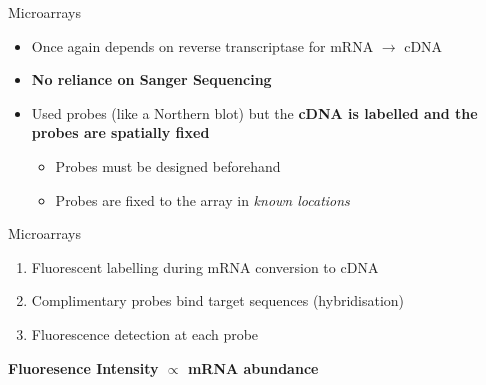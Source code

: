 \documentclass[aspectratio=169,11pt]{beamer}
\begin{document}
\begin{frame}{Microarrays}

	\begin{itemize}
		\item Once again depends on reverse transcriptase for mRNA $\rightarrow$ cDNA
		\item \textbf{No reliance on Sanger Sequencing}
		\item Used probes (like a Northern blot) but the \textbf{cDNA is labelled and the probes are spatially fixed}
		\begin{itemize}
			\item Probes must be designed beforehand
			\item Probes are fixed to the array in \textit{known locations}		
		\end{itemize}
	\end{itemize}
	
\end{frame}

\begin{frame}{Microarrays}

	\begin{enumerate}

		\item Fluorescent labelling during mRNA conversion to cDNA
		\item Complimentary probes bind target sequences (hybridisation)
		\item Fluorescence detection at each probe
	
	\end{enumerate}

	\begin{center}
	\textbf{Fluoresence Intensity $\propto$ mRNA abundance	}
	\end{center}

\end{frame}
\end{document}
